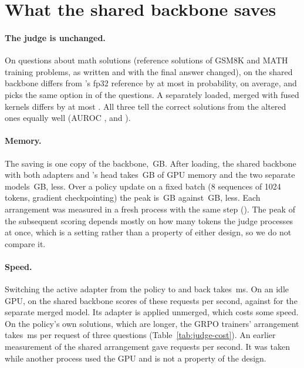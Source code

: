 
\section{What the shared backbone saves}\label{sec:res-shared}

\paragraph{The judge is unchanged.} On  questions about math solutions (reference
solutions of GSM8K and MATH training problems, as written and with the final answer changed), \kev{} on the shared
backbone differs from \kev{}'s fp32 reference by at most  in probability, 
on average, and picks the same option in  of the questions. A separately loaded, merged \kev{}
with fused kernels differs by at most . All three tell the correct solutions from the altered
ones equally well (AUROC ,  and
).

\paragraph{Memory.} The saving is one copy of the backbone, \,GB. After loading, the shared
backbone with both adapters and \kev{}'s head takes \,GB of GPU memory and the two separate models
\,GB,  less. Over a policy update on a fixed batch (8 sequences of 1024
tokens, gradient checkpointing) the peak is \,GB against \,GB,
 less. Each arrangement was measured in a fresh process with the same step
(). The peak of the subsequent \kev{} scoring depends mostly on
how many tokens the judge processes at once, which is a setting rather than a property of either design, so we do not
compare it.

\paragraph{Speed.} Switching the active adapter from the policy to \kev{} and back takes \,ms. On
an idle GPU, \kev{} on the shared backbone scores  of these requests per second, against
 for the separate merged model. Its adapter is applied unmerged, which costs some speed. On the
policy's own solutions, which are longer, the GRPO trainers' arrangement takes \,ms per request of
three questions (Table~\ref{tab:judge-cost}). An earlier measurement of the shared arrangement gave
 requests per second. It was taken while another process used the GPU and is not a property of
the design.

